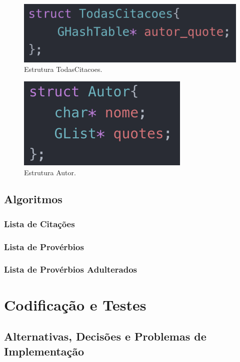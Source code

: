 \documentclass[11pt,a4paper]{report}
\begin{document}
\begin{figure}[H]
\centering
\includegraphics[scale=0.9]{TodasCitacoes.png}
\caption{Estrutura TodasCitacoes.}
\label{img:todas_citacoes}
\end{figure}

\begin{figure}[H]
\centering
\includegraphics[scale=0.9]{Autor.png}
\caption{Estrutura Autor.}
\label{img:autor}
\end{figure}


\section{Algoritmos}
\subsection{Lista de Citações}


\subsection{Lista de Provérbios}


\subsection{Lista de Provérbios Adulterados}



\chapter{Codificação e Testes}
\label{chap:codificacao}

\section{Alternativas, Decisões e Problemas de Implementação}
\end{document}
